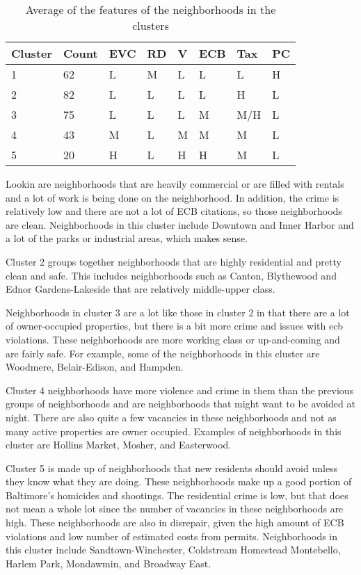 \documentclass[conference]{IEEEtran}
\begin{document}
\begin{table}
\centering
    \begin{tabular}{| l | l | l | l | l | l | l | l |}
    \hline
    \textbf{Cluster} & \textbf{Count} & \textbf{EVC} & \textbf{RD} & \textbf{V} & \textbf{ECB} & \textbf{Tax} & \textbf{PC}\\ \hline
    1 & 62 & L & M & L & L & L & H \\ \hline
    2 & 82 & L & L & L & L & H & L \\ \hline
    3 & 75 & L & L & L & M & M/H & L \\ \hline
    4 & 43 & M & L & M & M & M & L \\ \hline
    5 & 20 & H & L & H & H & M & L \\
    \hline
    \end{tabular}
    \caption{Average of the features of the neighborhoods in the clusters}
    \label{table:clusters}
\end{table}

Lookin
are neighborhoods that are heavily commercial or are filled with rentals and a lot of work is being done on the neighborhood.
In addition, the crime is relatively low and there are not a lot of ECB citations, so those neighborhoods are clean.  Neighborhoods in this
cluster include Downtown and Inner Harbor and a lot of the parks or industrial areas, which makes sense.

Cluster 2 groups together neighborhoods that are highly residential and pretty clean and safe.  This includes neighborhoods
such as Canton, Blythewood and Ednor Gardens-Lakeside that are relatively middle-upper class.

Neighborhoods in cluster 3 are a lot like those in cluster 2 in that there are a lot of owner-occupied properties, but there
is a bit more crime and issues with ecb violations.  These neighborhoods are more working class or up-and-coming and are fairly safe.  For example,
some of the neighborhoods in this cluster are Woodmere, Belair-Edison, and Hampden.

Cluster 4 neighborhoods have more violence and crime in them than the previous groups of neighborhoods and are neighborhoods
that might want to be avoided at night.  There are also quite
a few vacancies in these neighborhoods and not as many active properties are owner occupied.  Examples of neighborhoods in this cluster
are Hollins Market, Mosher, and Easterwood.

Cluster 5 is made up of neighborhoods that new residents should avoid unless they know what they are doing.  These neighborhoods
make up a good portion of Baltimore's homicides and shootings.  The residential crime is low, but that does not mean a whole
lot since the number of vacancies in these neighborhoods are high.  These neighborhoods are also in disrepair, given the
high amount of ECB violations and low number of estimated costs from permits.  Neighborhoods in this cluster include
Sandtown-Winchester, Coldstream Homestead Montebello, Harlem Park, Mondawmin, and Broadway East.
\end{document}
